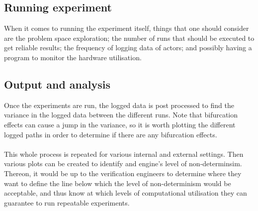 \subsection{Running experiment}
\noindent When it comes to running the experiment itself, things that one should consider  are the problem space exploration; the number of runs that should be executed to get reliable results; the frequency of logging data of actors; and possibly having a program to monitor the hardware utilisation.

\subsection{Output and analysis}
\noindent Once the experiments are run, the logged data is post processed to find the variance in the logged data between the different runs. Note that bifurcation effects can cause a jump in the variance, so it is worth plotting the different logged paths in order to determine if there are any bifurcation effects.\\\\
This whole process is repeated for various internal and external settings. 
Then various plots can be created to identify and engine's level of non-determinsim. 
Thereon, it would be up to the verification engineers to determine where they want to define the line below which the level of non-determinism would be acceptable, and thus know at which levels of computational utilisation they can guarantee to run repeatable experiments.   

